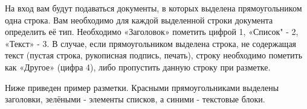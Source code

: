 \documentclass[a4paper,12pt]{article}
\begin{document}
На вход вам будут подаваться документы, в которых выделена прямоугольником одна строка. Вам необходимо для каждой выделенной строки документа определить её тип. Необходимо «Заголовок» пометить цифрой 1, «Список" - 2, «Текст» - 3. В случае, если прямоугольником выделена строка, не содержащая текст (пустая строка, рукописная подпись, печать), строку необходимо пометить как «Другое» (цифра 4), либо пропустить данную строку при разметке.

Ниже приведен пример разметки. Красными прямоугольниками выделены заголовки, зелёными - элементы списков, а синими - текстовые блоки.

\begin{center}
\end{center}
\end{document}

